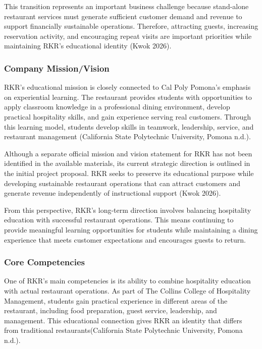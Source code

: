 \documentclass[
  12pt,
  letterpaper,
  DIV=11,
  numbers=noendperiod]{scrartcl}
\begin{document}
This transition represents an important business challenge because
stand-alone restaurant services must generate sufficient customer demand
and revenue to support financially sustainable operations. Therefore,
attracting guests, increasing reservation activity, and encouraging
repeat visits are important priorities while maintaining RKR's
educational identity (Kwok 2026).

\subsubsection{Company Mission/Vision}\label{company-missionvision}

RKR's educational mission is closely connected to Cal Poly Pomona's
emphasis on experiential learning. The restaurant provides students with
opportunities to apply classroom knowledge in a professional dining
environment, develop practical hospitality skills, and gain experience
serving real customers. Through this learning model, students develop
skills in teamwork, leadership, service, and restaurant management
(California State Polytechnic University, Pomona n.d.).

Although a separate official mission and vision statement for RKR has
not been identified in the available materials, its current strategic
direction is outlined in the initial project proposal. RKR seeks to
preserve its educational purpose while developing sustainable restaurant
operations that can attract customers and generate revenue independently
of instructional support (Kwok 2026).

From this perspective, RKR's long-term direction involves balancing
hospitality education with successful restaurant operations. This means
continuing to provide meaningful learning opportunities for students
while maintaining a dining experience that meets customer expectations
and encourages guests to return.

\subsubsection{Core Competencies}\label{core-competencies}

One of RKR's main competencies is its ability to combine hospitality
education with actual restaurant operations. As part of The Collins
College of Hospitality Management, students gain practical experience in
different areas of the restaurant, including food preparation, guest
service, leadership, and management. This educational connection gives
RKR an identity that differs from traditional restaurants(California
State Polytechnic University, Pomona n.d.).
\end{document}
